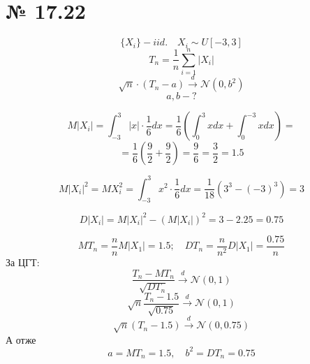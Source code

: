 \documentclass[11pt, a4paper]{article} %
\begin{document}
\section*{№ 17.22}
\begin{mdframed}
    \[\{X_i\} - iid. \quad X_i \sim U[-3,3]\]
    \[T_n = \frac{1}{n} \sum_{i=1}^n |X_i|\]
    \[\sqrt{n} \cdot (T_n - a) \overset{d}{\longrightarrow} \mathcal{N}(0,b^2) \]
    \[a,b - ?\]
\end{mdframed}

\[M|X_i| = \int_{-3}^3 |x| \cdot \frac{1}{6}dx = \frac{1}{6} \left(\int_0^3 x dx + \int_{0}^{-3} x dx\right) = \]
\[= \frac{1}{6} \left(\frac{9}{2} + \frac{9}{2}\right) = \frac{9}{6} = \frac{3}{2} = 1.5\]

\[M|X_i|^2 = MX_i^2 = \int_{-3}^3 x^2 \cdot \frac{1}{6}dx = \frac{1}{18} \left(3^3 - (-3)^3\right) = 3\]

\[D|X_i| = M|X_i|^2 - \left(M|X_i|\right)^2 = 3 - 2.25 = 0.75\]

\[MT_n = \frac{n}{n}M|X_1| = 1.5; \quad DT_n = \frac{n}{n^2}D|X_1| = \frac{0.75}{n}\]
За ЦГТ:
\[\frac{T_n - MT_n}{\sqrt{DT_n}} \overset{d}{\longrightarrow} \mathcal{N}(0,1)\]
\[\sqrt{n} \frac{T_n - 1.5}{\sqrt{0.75}} \overset{d}{\longrightarrow} \mathcal{N}(0,1)\]
\[\sqrt{n} (T_n - 1.5) \overset{d}{\longrightarrow} \mathcal{N}(0,0.75)\]
А отже 
\[a = MT_n = 1.5,\quad b^2 = DT_n = 0.75\]
\end{document}
